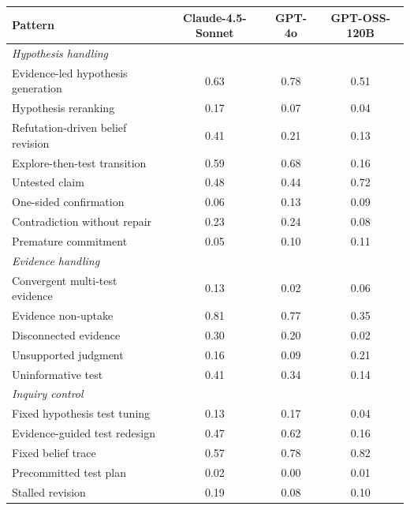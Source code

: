 \begin{tabularx}{\linewidth}{X c c c}
\toprule
Pattern & Claude-4.5-Sonnet & GPT-4o & GPT-OSS-120B \\
\midrule
\multicolumn{4}{l}{\textit{Hypothesis handling}} \\
\midrule
Evidence-led
hypothesis generation & 0.63 & 0.78 & 0.51 \\
Hypothesis reranking & 0.17 & 0.07 & 0.04 \\
Refutation-driven belief revision & 0.41 & 0.21 & 0.13 \\
Explore-then-test transition & 0.59 & 0.68 & 0.16 \\
Untested claim & 0.48 & 0.44 & 0.72 \\
One-sided confirmation & 0.06 & 0.13 & 0.09 \\
Contradiction without repair & 0.23 & 0.24 & 0.08 \\
Premature commitment & 0.05 & 0.10 & 0.11 \\
\midrule
\multicolumn{4}{l}{\textit{Evidence handling}} \\
\midrule
Convergent multi-test
evidence & 0.13 & 0.02 & 0.06 \\
Evidence non-uptake & 0.81 & 0.77 & 0.35 \\
Disconnected evidence & 0.30 & 0.20 & 0.02 \\
Unsupported judgment & 0.16 & 0.09 & 0.21 \\
Uninformative test & 0.41 & 0.34 & 0.14 \\
\midrule
\multicolumn{4}{l}{\textit{Inquiry control}} \\
\midrule
Fixed hypothesis test tuning & 0.13 & 0.17 & 0.04 \\
Evidence-guided test redesign & 0.47 & 0.62 & 0.16 \\
Fixed belief trace & 0.57 & 0.78 & 0.82 \\
Precommitted test plan & 0.02 & 0.00 & 0.01 \\
Stalled revision & 0.19 & 0.08 & 0.10 \\
\bottomrule
\end{tabularx}
